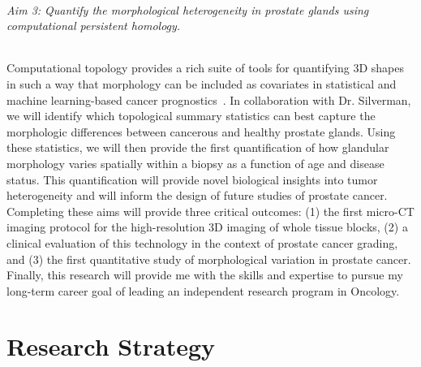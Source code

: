 \documentclass{NIHGrant}
\theoremstyle{theorem}
\begin{document}
\paragraph*{Aim 3: Quantify the morphological heterogeneity in prostate glands using computational persistent homology.}

Computational topology provides a rich suite of tools for quantifying 3D shapes in such a way that morphology can be included as covariates in statistical and machine learning-based cancer prognostics~\cite{primakov_automated_2022,crawford_predicting_2020}. In collaboration with Dr. Silverman, we will identify which topological summary statistics can best capture the morphologic differences between cancerous and healthy prostate glands. Using these statistics, we will then provide the first quantification of how glandular morphology varies spatially within a biopsy as a function of age and disease status. This quantification will provide novel biological insights into tumor heterogeneity and will inform the design of future studies of prostate cancer.  \\[5pt]
%
\noindent
Completing these aims will provide three critical outcomes: (1) the first micro-CT imaging protocol for the high-resolution 3D imaging of whole tissue blocks, (2) a clinical evaluation of this technology in the context of prostate cancer grading, and (3) the first quantitative study of morphological variation in prostate cancer. Finally, this research will provide me with the skills and expertise to pursue my long-term career goal of leading an independent research program in Oncology.

\newpage
\part*{Research Strategy}
\end{document}
